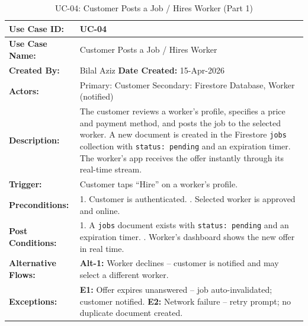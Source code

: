 {\small
\renewcommand{\arraystretch}{1.05}
\begin{table}[H]
\centering
\begin{tabular}{|p{3cm}|p{11.2cm}|}
\hline
\textbf{Use Case ID:} & UC-04 \\ \hline
\textbf{Use Case Name:} & Customer Posts a Job / Hires Worker \\ \hline
\textbf{Created By:} & Bilal Aziz \hfill \textbf{Date Created:} 15-Apr-2026 \\ \hline
\textbf{Actors:} & Primary: Customer \quad Secondary: Firestore Database, Worker (notified) \\ \hline
\textbf{Description:} & The customer reviews a worker's profile, specifies a price and payment method, and posts the job to the selected worker. A new document is created in the Firestore \texttt{jobs} collection with \texttt{status: pending} and an expiration timer. The worker's app receives the offer instantly through its real-time stream. \\ \hline
\textbf{Trigger:} & Customer taps ``Hire'' on a worker's profile. \\ \hline
\textbf{Preconditions:} & 1. Customer is authenticated. \newline 2. Selected worker is approved and online. \\ \hline
\textbf{Post Conditions:} & 1. A \texttt{jobs} document exists with \texttt{status: pending} and an expiration timer. \newline 2. Worker's dashboard shows the new offer in real time. \\ \hline
\textbf{Alternative Flows:} & \textbf{Alt-1:} Worker declines -- customer is notified and may select a different worker. \\ \hline
\textbf{Exceptions:} & \textbf{E1:} Offer expires unanswered -- job auto-invalidated; customer notified. \newline \textbf{E2:} Network failure -- retry prompt; no duplicate document created. \\ \hline
\end{tabular}
\caption*{UC-04: Customer Posts a Job / Hires Worker (Part 1)}
\end{table}
}

\newpage

